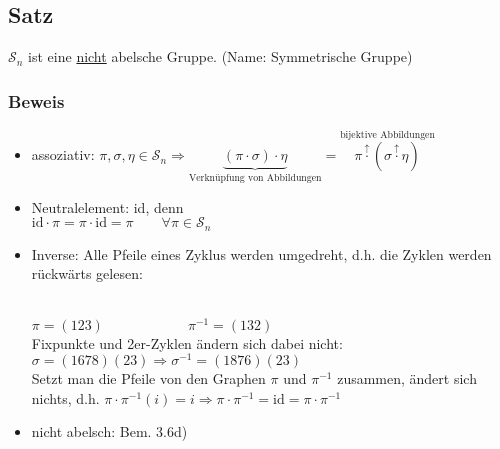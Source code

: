 \documentclass[12pt,titlepage, pdf]{article}
\newcommand{\uline}[1]{\underline{#1}}
\newcommand{\id}{\textrm{id}}
\renewcommand{\>}{\rightarrow}
\renewcommand{\*}{\cdot}
\begin{document}
\subsection{Satz}
$\mathscr{S}_n$ ist eine \uline{nicht} abelsche Gruppe. (Name: Symmetrische Gruppe) \\
\subsubsection*{Beweis}
\begin{itemize}
	\item assoziativ: $\pi, \sigma, \eta \in \mathscr{S}_n \Rightarrow \underbrace{(\pi \cdot \sigma) \cdot \eta}_{\textrm{Verknüpfung von Abbildungen}} = \overset{\textrm{bijektive Abbildungen}}{\pi \overset{\uparrow}{\cdot} (\sigma \overset{\uparrow}{\cdot} \eta)}$
	\item Neutralelement: id, denn \\
	$\id \cdot \pi = \pi \cdot \id = \pi\qquad\forall\pi\in\mathscr{S}_n$
	\item Inverse: Alle Pfeile eines Zyklus werden umgedreht, d.h. die Zyklen werden rückwärts gelesen:\\
	\\
	$\pi=(123)\qquad\qquad\qquad\pi^{-1}=(132)$\\
Fixpunkte und 2er-Zyklen ändern sich dabei nicht:\\
$\sigma = (1678)(23)\Rightarrow\sigma^{-1} = (1876)(23)$\\
Setzt man die Pfeile von den Graphen $\pi$ und $\pi^{-1}$ zusammen, ändert sich nichts, d.h. $\pi \cdot  \pi^{-1}(i) = i \Rightarrow \pi \cdot  \pi^{-1} = \id = \pi \cdot  \pi^{-1}$
\item nicht abelsch: Bem. 3.6d)
\end{itemize}\newpage
{}
\end{document}
